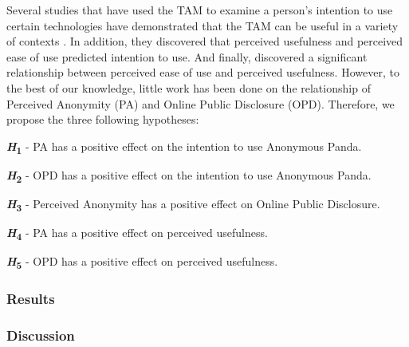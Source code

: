 Several studies that have used the TAM to examine a person's intention to use certain technologies have demonstrated that the TAM can be useful in a variety of contexts \cite{CAM20}. In addition, they discovered that perceived usefulness and perceived ease of use predicted intention to use. And finally, discovered a significant relationship between perceived ease of use and perceived usefulness. However, to the best of our knowledge, little work has been done on the relationship of Perceived Anonymity (PA) and Online Public Disclosure (OPD). Therefore, we propose the three following hypotheses:

\textbf{\textit{H}\textsubscript{1}} - PA has a positive effect on the intention to use Anonymous Panda.

\textbf{\textit{H}\textsubscript{2}} - OPD has a positive effect on the intention to use Anonymous Panda.

\textbf{\textit{H}\textsubscript{3}} - Perceived Anonymity has a positive effect on Online Public Disclosure.

\textbf{\textit{H}\textsubscript{4}} - PA has a positive effect on perceived usefulness.

\textbf{\textit{H}\textsubscript{5}} - OPD has a positive effect on perceived usefulness.

\subsubsection{Results}


\subsubsection{Discussion}

